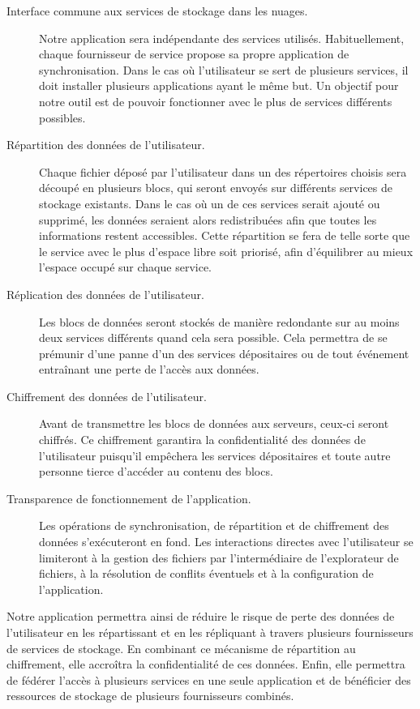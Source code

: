 \begin{description}
    \item[Interface commune aux services de stockage dans les nuages.] Notre application sera indépendante des services utilisés. Habituellement, chaque fournisseur de service propose sa propre application de synchronisation. Dans le cas où l'utilisateur se sert de plusieurs services, il doit installer plusieurs applications ayant le même but. Un objectif pour notre outil est de pouvoir fonctionner avec le plus de services différents possibles.
    \item[Répartition des données de l'utilisateur.] Chaque fichier déposé par l'utilisateur dans un des répertoires choisis sera découpé en plusieurs blocs, qui seront envoyés sur différents services de stockage existants. Dans le cas où un de ces services serait ajouté ou supprimé, les données seraient alors redistribuées afin que toutes les informations restent accessibles. Cette répartition se fera de telle sorte que le service avec le plus d'espace libre soit priorisé, afin d'équilibrer au mieux l'espace occupé sur chaque service.
    \item[Réplication des données de l'utilisateur.] Les blocs de données seront stockés de manière redondante sur au moins deux services différents quand cela sera possible. Cela permettra de se prémunir d'une panne d'un des services dépositaires ou de tout événement entraînant une perte de l'accès aux données.
    \item[Chiffrement des données de l'utilisateur.] Avant de transmettre les blocs de données aux serveurs, ceux-ci seront chiffrés. Ce chiffrement garantira la confidentialité des données de l'utilisateur puisqu'il empêchera les services dépositaires et toute autre personne tierce d'accéder au contenu des blocs.
    \item[Transparence de fonctionnement de l'application.] Les opérations de synchronisation, de répartition et de chiffrement des données s'exécuteront en fond. Les interactions directes avec l'utilisateur se limiteront à la gestion des fichiers par l'intermédiaire de l'explorateur de fichiers, à la résolution de conflits éventuels et à la configuration de l'application.
\end{description}

Notre application permettra ainsi de réduire le risque de perte des données de l'utilisateur en les répartissant et en les répliquant à travers plusieurs fournisseurs de services de stockage. En combinant ce mécanisme de répartition au chiffrement, elle accroîtra la confidentialité de ces données. Enfin, elle permettra de fédérer l'accès à plusieurs services en une seule application et de bénéficier des ressources de stockage de plusieurs fournisseurs combinés.

